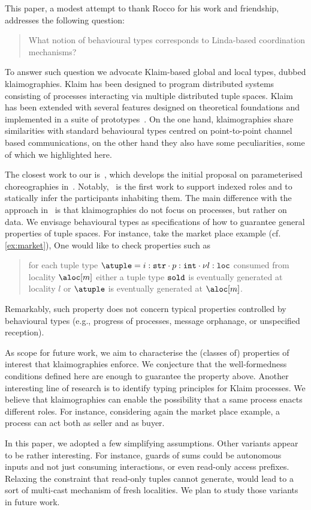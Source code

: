 

This paper, a modest attempt to thank Rocco for his work and
friendship, addresses the following question:
%
\begin{quote}
  What notion of behavioural types corresponds to Linda-based
  coordination mechanisms?
\end{quote}
%
To answer such question we advocate Klaim-based global and local
types, dubbed klaimographies.
%
Klaim has been designed to program distributed systems consisting of
processes interacting via multiple distributed tuple spaces.
%
Klaim has been extended with several features designed on theoretical
foundations and implemented in a suite of
prototypes~\cite{klaim}.
%
On the one hand, klaimographies share similarities with standard
behavioural types centred on point-to-point channel based
communications, on the other hand they also have some peculiarities,
some of which we highlighted here.



The closest work to our is~\cite{chjny19}, which develops the initial
proposal on parameterised choreographies in~\cite{ydbh10,dybh12}.
%
Notably,~\cite{chjny19} is the first work to support indexed roles and
to statically infer the participants inhabiting them.
%
The main difference with the approach in~\cite{chjny19} is that
klaimographies do not focus on processes, but rather on data.
%
We envisage behavioural types as specifications of how to guarantee
general properties of tuple spaces.
%
For instance, take the market place example (cf. \cref{ex:market}),
%
One would like to check properties such as
\begin{quote}
  for each tuple type
  $\atuple = {{i : \asort[str]} \cdot {p : \asort[int]} \cdot {\nu l :
      \asort[loc]}}$ consumed from locality $\aloc[m]$ either a tuple type
  $\asort[sold]$ is eventually generated at locality $l$ or $\atuple$
  is eventually generated at $\aloc[m]$.
\end{quote}
%
Remarkably, such property does not concern typical properties
controlled by behavioural types (e.g., progress of processes, message
orphanage, or unspecified reception).

As scope for future work, we aim to characterise the (classes of)
properties of interest that klaimographies enforce.
%
We conjecture that the well-formedness conditions defined here
are enough to guarantee the property above.
%
Another interesting line of research is to identify typing principles
for Klaim processes.
%
We believe that klaimographies can enable the possibility that a same
process enacts different roles.
%
For instance, considering again the market place example, a process
can act both as seller and as buyer.

In this paper, we adopted a few simplifying assumptions.
%
Other variants appear to be rather interesting.
%
For instance, guards of sums could be autonomous inputs and not just
consuming interactions, or even read-only access prefixes.
%
Relaxing the constraint that read-only tuples cannot generate, would
lead to a sort of multi-cast mechanism of fresh localities.
%
We plan to study those variants in future work.


